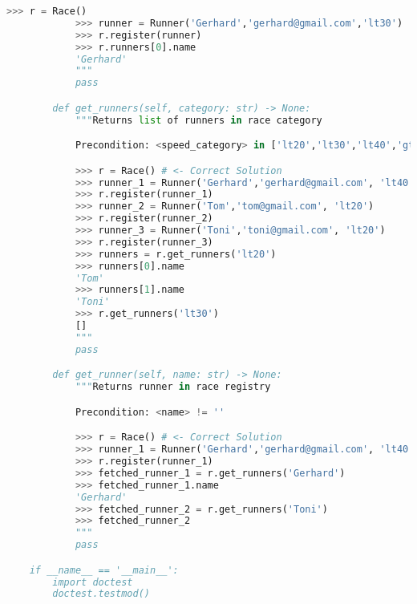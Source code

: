 \documentclass[12pt]{article}
\begin{document}
\begin{enumerate}[1.]
\begin{mdframed}
\begin{lstlisting}[language=Python]
            >>> r = Race()
            >>> runner = Runner('Gerhard','gerhard@gmail.com','lt30')
            >>> r.register(runner)
            >>> r.runners[0].name
            'Gerhard'
            """
            pass

        def get_runners(self, category: str) -> None:
            """Returns list of runners in race category

            Precondition: <speed_category> in ['lt20','lt30','lt40','gt40'] # <- correct solution

            >>> r = Race() # <- Correct Solution
            >>> runner_1 = Runner('Gerhard','gerhard@gmail.com', 'lt40')
            >>> r.register(runner_1)
            >>> runner_2 = Runner('Tom','tom@gmail.com', 'lt20')
            >>> r.register(runner_2)
            >>> runner_3 = Runner('Toni','toni@gmail.com', 'lt20')
            >>> r.register(runner_3)
            >>> runners = r.get_runners('lt20')
            >>> runners[0].name
            'Tom'
            >>> runners[1].name
            'Toni'
            >>> r.get_runners('lt30')
            []
            """
            pass

        def get_runner(self, name: str) -> None:
            """Returns runner in race registry

            Precondition: <name> != ''

            >>> r = Race() # <- Correct Solution
            >>> runner_1 = Runner('Gerhard','gerhard@gmail.com', 'lt40')
            >>> r.register(runner_1)
            >>> fetched_runner_1 = r.get_runners('Gerhard')
            >>> fetched_runner_1.name
            'Gerhard'
            >>> fetched_runner_2 = r.get_runners('Toni')
            >>> fetched_runner_2
            """
            pass

    if __name__ == '__main__':
        import doctest
        doctest.testmod()

    \end{lstlisting}
\end{mdframed}

\end{enumerate}
\end{document}
